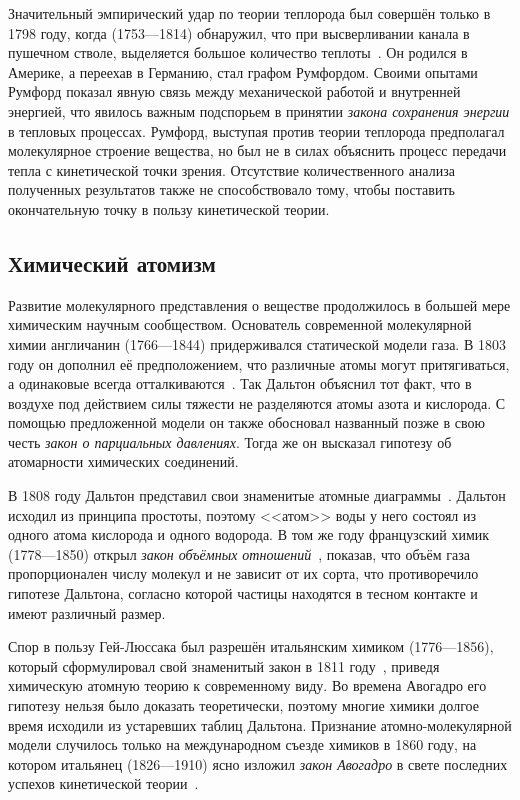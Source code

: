\documentclass[a4paper, 12pt, oneside]{article} %
\begin{document}
Значительный эмпирический удар по теории теплорода был совершён только в
1798 году, когда  (1753---1814) обнаружил, что
при высверливании канала в пушечном стволе, выделяется большое
количество теплоты~\cite{thompson1798heat}. Он родился в Америке, а
переехав в Германию, стал графом Румфордом. Своими опытами Румфорд
показал явную связь между механической работой и внутренней энергией,
что явилось важным подспорьем в принятии \emph{закона сохранения
энергии} в тепловых процессах. Румфорд, выступая против теории теплорода
предполагал молекулярное строение вещества, но был не в силах объяснить
процесс передачи тепла с кинетической точки зрения. Отсутствие
количественного анализа полученных результатов также не способствовало
тому, чтобы поставить окончательную точку в пользу кинетической теории.

\subsection{Химический атомизм}

Развитие молекулярного представления о веществе продолжилось в большей
мере химическим научным сообществом. Основатель современной молекулярной
химии англичанин  (1766---1844) придерживался
статической модели газа. В 1803 году он дополнил её предположением, что
различные атомы могут притягиваться, а одинаковые всегда
отталкиваются~\cite{dalton1805absorption}. Так Дальтон объяснил тот
факт, что в воздухе под действием силы тяжести не разделяются атомы
азота и кислорода. С помощью предложенной модели он также обосновал
названный позже в свою честь \emph{закон о парциальных давлениях}. Тогда
же он высказал гипотезу об атомарности химических соединений.

В 1808 году Дальтон представил свои знаменитые атомные
диаграммы~\cite{dalton2010new}. Дальтон исходил из принципа простоты,
поэтому <<атом>> воды у него состоял из одного атома кислорода и одного
водорода. В том же году французский химик 
(1778---1850) открыл \emph{закон объёмных
отношений}~\cite{gay1809memoire}, показав, что объём газа пропорционален
числу молекул и не зависит от их сорта, что противоречило гипотезе
Дальтона, согласно которой частицы находятся в тесном контакте и имеют
различный размер.

Спор в пользу Гей-Люссака был разрешён итальянским химиком
 (1776---1856), который сформулировал свой
знаменитый закон в 1811 году~\cite{avogadro1811essai}, приведя
химическую атомную теорию к современному виду. Во времена Авогадро его
гипотезу нельзя было доказать теоретически, поэтому многие химики долгое
время исходили из устаревших таблиц Дальтона. Признание
атомно-молекулярной модели случилось только на международном съезде
химиков в 1860 году, на котором итальянец 
(1826---1910) ясно изложил \emph{закон Авогадро} в свете последних
успехов кинетической теории~\cite{hartley1966stanislao}.
\end{document}
